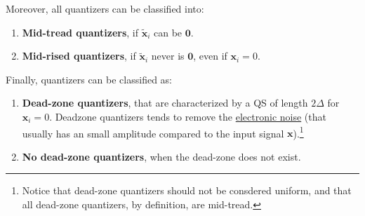 Moreover, all quantizers can be classified into:
\begin{enumerate}
\item \textbf{Mid-tread quantizers}, if $\tilde{{\mathbf x}}_i$ can be ${\mathbf 0}$.
\item \textbf{Mid-rised quantizers}, if $\tilde{{\mathbf x}}_i$ never is ${\mathbf 0}$,
  even if ${\mathbf x}_i=0$.
\end{enumerate}

Finally, quantizers can be classified as:
\begin{enumerate}
\item \textbf{Dead-zone quantizers}, that are characterized by a QS of
  length $2\Delta$ for ${\mathbf x}_i=0$. Deadzone quantizers tends to
  remove the
  \href{https://en.wikipedia.org/wiki/Noise_(electronics)}{electronic
    noise} (that usually has an small amplitude compared to the input
  signal ${\mathbf x}$).\footnote{Notice that dead-zone quantizers
  should not be consdered uniform, and that all dead-zone quantizers,
  by definition, are mid-tread.}
\item \textbf{No dead-zone quantizers}, when the dead-zone does not
  exist.
\end{enumerate}

\begin{comment}
\begin{figure}
  \centering
  \myfig{io_map_mr}{5cm}{500}
  \caption{Input/output mapping of a mid-riser quantizer with $\Delta=2$.}
  \label{fig:iomap_mr}
\end{figure}

\begin{figure}
  \centering
  \myfig{qe_mr}{5cm}{500}
  \caption{Quantization error of a mid-riser quantizer with $\Delta=2$.}
  \label{fig:qe_mr}
\end{figure}

\begin{figure}
  \centering
  \myfig{io_map_mt}{5cm}{500}
  \caption{Input/output map of a mid-tread quantizer with $\Delta=2$.}
  \label{fig:iomap_mt}
\end{figure}

\begin{figure}
  \centering
  \myfig{qe_mt}{5cm}{500}
  \caption{Quantization error of a mid-tread quantizer with $\Delta=2$.}
  \label{fig:qe_mt}
\end{figure}

\begin{figure}
  \centering
  \myfig{io_map_dz}{5cm}{500}
  \caption{Input/output map of a dead-zone quantizer with $\Delta=2$.}
  \label{fig:iomap_dz}
\end{figure}

\begin{figure}
  \centering
  \myfig{qe_dz}{5cm}{500}
  \caption{Quantization error of a dead-zone quantizer with $\Delta=2$.}
  \label{fig:qe_dz}
\end{figure}
\end{comment}

